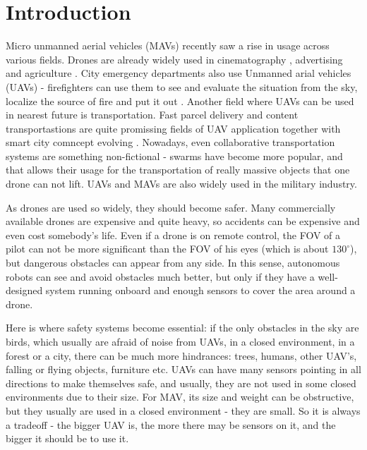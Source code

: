 \chapter{Introduction}

\label{chapter:intro}

Micro unmanned aerial vehicles (MAVs) recently saw a rise in usage across various fields. 
Drones are already widely used in cinematography \cite{Mademlis2020}, advertising \cite{Ullah2021} and agriculture \cite{Kim2019}. 
City emergency departments also use Unmanned arial vehicles (UAVs) - firefighters can use them to see and evaluate the situation from the sky, localize the source of fire and put it out \cite{Pritzl2021}.
Another field where UAVs can be used in nearest future is transportation. 
Fast parcel delivery \cite{San2018} and content transportastions \cite{Gupta2021,Aloqaily2022} are quite promissing fields of UAV application together with smart city comncept evolving \cite{Ortiz2019}.
Nowadays, even collaborative transportation systems are something non-fictional - swarms have become more popular, and that allows their usage for the transportation of really massive objects \cite{Bacelar2020} that one drone can not lift. 
UAVs and MAVs are also widely used in the military industry\cite{Duz2021}.

As drones are used so widely, they should become safer. 
Many commercially available drones are expensive and quite heavy, so accidents can be expensive and even cost somebody's life. 
Even if a drone is on remote control, the FOV of a pilot can not be more significant than the FOV of his eyes (which is about $130^\circ$), but dangerous obstacles can appear from any side.
In this sense, autonomous robots can see and avoid obstacles much better, but only if they have a well-designed system running onboard and enough sensors to cover the area around a drone.

Here is where safety systems become essential: if the only obstacles in the sky are birds, which usually are afraid of noise from UAVs, in a closed environment, in a forest or a city, there can be much more hindrances: trees, humans, other UAV's, falling or flying objects, furniture etc.
UAVs can have many sensors pointing in all directions to make themselves safe, and usually, they are not used in some closed environments due to their size.
For MAV, its size and weight can be obstructive, but they usually are used in a closed environment - they are small.
So it is always a tradeoff - the bigger UAV is, the more there may be sensors on it, and the bigger it should be to use it. 

